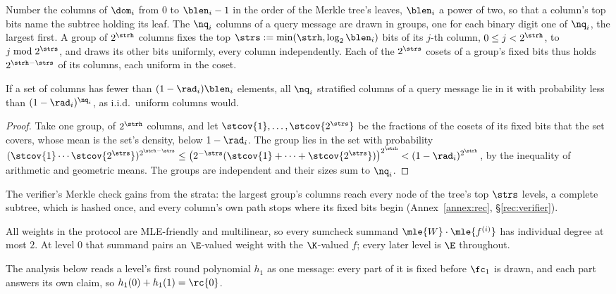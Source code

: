 \begin{definition}\label{def:strata}
Number the columns of $\dom_i$ from $0$ to $\blen_i - 1$ in the order of the Merkle tree's leaves, $\blen_i$ a power of two, so that a column's top bits name the subtree holding its leaf. The $\nq_i$ columns of a query message are drawn in groups, one for each binary digit one of $\nq_i$, the largest first. A group of $2^{\strh}$ columns fixes the top $\strs := \min(\strh, \log_2 \blen_i)$ bits of its $j$-th column, $0 \le j < 2^{\strh}$, to $j \bmod 2^{\strs}$, and draws its other bits uniformly, every column independently. Each of the $2^{\strs}$ cosets of a group's fixed bits thus holds $2^{\strh - \strs}$ of its columns, each uniform in the coset.
\end{definition}

\begin{lemma}\label{lem:strata}
If a set of columns has fewer than $(1 - \rad_i)\blen_i$ elements, all $\nq_i$ stratified columns of a query message lie in it with probability less than $(1 - \rad_i)^{\nq_i}$, as i.i.d.\ uniform columns would.
\end{lemma}

\begin{proof}
Take one group, of $2^{\strh}$ columns, and let $\stcov{1}, \dots, \stcov{2^{\strs}}$ be the fractions of the cosets of its fixed bits that the set covers, whose mean is the set's density, below $1 - \rad_i$. The group lies in the set with probability $(\stcov{1} \cdots \stcov{2^{\strs}})^{2^{\strh - \strs}} \le \bigl(2^{-\strs}(\stcov{1} + \dots + \stcov{2^{\strs}})\bigr)^{2^{\strh}} < (1 - \rad_i)^{2^{\strh}}$, by the inequality of arithmetic and geometric means. The groups are independent and their sizes sum to $\nq_i$.
\end{proof}

The verifier's Merkle check gains from the strata: the largest group's columns reach every node of the tree's top $\strs$ levels, a complete subtree, which is hashed once, and every column's own path stops where its fixed bits begin (Annex~\ref{annex:rec}, \S\ref{rec:verifier}).

All weights in the protocol are MLE-friendly and multilinear, so every sumcheck summand $\mle{W} \cdot \mle{f^{(i)}}$ has individual degree at most $2$. At level $0$ that summand pairs an $\E$-valued weight with the $\K$-valued $f$; every later level is $\E$ throughout.

The analysis below reads a level's first round polynomial $h_1$ as one message: every part of it is fixed before $\fc_1$ is drawn, and each part answers its own claim, so $h_1(0) + h_1(1) = \rc{0}$.

